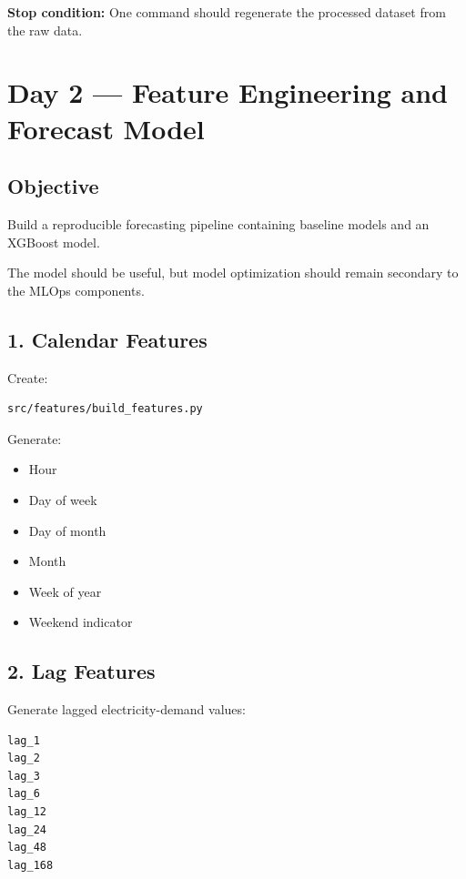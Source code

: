 \documentclass[11pt,a4paper]{article}
\begin{document}
\textbf{Stop condition:} One command should regenerate the processed dataset from the raw data.

\newpage


\section{Day 2 --- Feature Engineering and Forecast Model}

\subsection{Objective}

Build a reproducible forecasting pipeline containing baseline models and an XGBoost model.

The model should be useful, but model optimization should remain secondary to the MLOps components.

\subsection{1. Calendar Features}

Create:

\begin{lstlisting}
src/features/build_features.py
\end{lstlisting}

Generate:

\begin{itemize}
    \item Hour
    \item Day of week
    \item Day of month
    \item Month
    \item Week of year
    \item Weekend indicator
\end{itemize}

\subsection{2. Lag Features}

Generate lagged electricity-demand values:

\begin{lstlisting}
lag_1
lag_2
lag_3
lag_6
lag_12
lag_24
lag_48
lag_168
\end{lstlisting}
\end{document}
